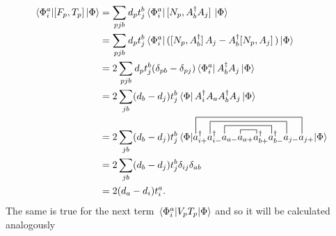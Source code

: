 \documentclass[Dual]{msu-thesis}
\begin{document}
\begin{align}
\mel*{\Phi_i^a}{\comm*{F_p}{T_p}}{\Phi}
&=
\sum_{pjb}d_pt_j^b\bra*{\Phi_i^a}\comm*{N_p}{A^\dagger_bA_j}\ket{\Phi}
\nonumber
\\
&=
\sum_{pjb}d_pt_j^b\bra*{\Phi_i^a}(\comm*{N_p}{A^\dagger_b}A_j-A^\dagger_b\comm*{N_p}{A_j})\ket{\Phi}
\nonumber
\\
&=
2\sum_{pjb}d_pt_j^b(\delta_{pb}-\delta_{pj})\bra*{\Phi_i^a}A^\dagger_bA_j\ket{\Phi}
\nonumber
\\
&=
2\sum_{jb}(d_b-d_j)t_j^b\bra*{\Phi}A^\dagger_iA_aA^\dagger_bA_j\ket{\Phi}
\nonumber
\\
&=
2\sum_{jb}(d_b-d_j)t_j^b
\mel*{\Phi}{
\contraction[1ex]{a^\dagger_{i+}a^\dagger_{i-}a_{a-}}{a}{_{a+}}
{a}
\contraction[2ex]{a^\dagger_{i+}a^\dagger_{i-}}{a}{_{a-}a_{a+}
a^\dagger_{b+}}{a}
\contraction[3ex]{a^\dagger_{i+}}{a}{^\dagger_{i-}a_{a-}a_{a+}
a^\dagger_{b+}a^\dagger_{b-}}{a}
\contraction[4ex]{}{a}{^\dagger_{i+}a^\dagger_{i-}a_{a-}a_{a+}
a^\dagger_{b+}a^\dagger_{b-}a_{j-}}{a}
a^\dagger_{i+}a^\dagger_{i-}a_{a-}a_{a+}a^\dagger_{b+}a^\dagger_{b-}a_{j-}a_{j+}
}{\Phi}
\nonumber
\\
&=
2\sum_{jb}(d_b-d_j)t_j^b\delta_{ij}\delta_{ab}
\nonumber
\\
&=
2(d_a-d_i)t_i^a
.\end{align}
The same is true for the next term $\mel*{\Phi^a_i}{V_pT_p}{\Phi}$ and so it will be calculated analogously
\end{document}
